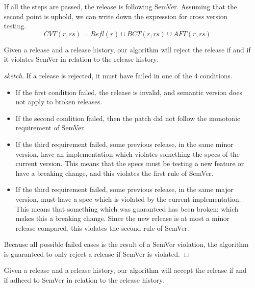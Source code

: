 If all the steps are passed, the release is following SemVer. Assuming that the 
second point is uphold, we can write down the expression for cross version testing. 
$$ CVT(r, rs) = Refl(r) \cup BCT(r, rs) \cup AFT(r, rs) $$

\begin{theorem}[Soundness]
Given a release and a release history, our algorithm will reject the release if
and if it violates SemVer in relation to the release history.
\end{theorem}

\begin{proof}[sketch]
If a release is rejected, it must have failed in one of the 4 conditions. 
\begin{itemize}
  \item If the first condition failed, the release is invalid, and semantic
      version does not apply to broken releases. 
  \item If the second condition failed, then the patch did not follow the
      monotonic requirement of SemVer. 
  \item If the third requirement failed, some previous release, in the same
      minor version, have an implementation which violates something the specs
      of the current version. This means that the specs must be testing a new
      feature or have a breaking change, and this violates the first rule of
      SemVer.
  \item If the third requirement failed, some previous release, in the same
      major version,  must have a spec which is violated by the current
      implementation. This means that something which was guaranteed has been
      broken; which makes this a breaking change. Since the new release is at
      most a minor release compared, this violates the second rule of SemVer.
\end{itemize}
Because all possible failed cases is the result of a SemVer violation, the
algorithm is guaranteed to only reject a release if SemVer is violated.
\end{proof}

\begin{theorem}[Completness]
Given a release and a release history, our algorithm will accept the release if
and if adheed to SemVer in relation to the release history.
\end{theorem}


